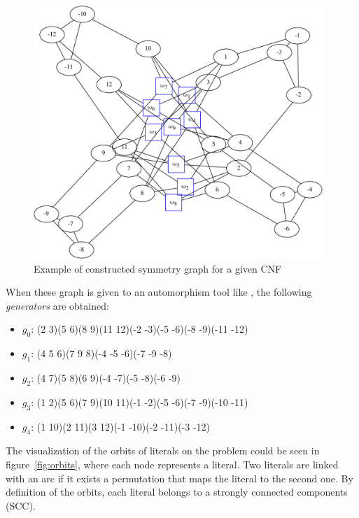 \begin{figure}[h]
	\begin{minipage}[c]{.2\textwidth}
		
	\end{minipage}
	\begin{minipage}[l]{.75\textwidth}
		\includegraphics[width=4.3in]{cnfs/graph_cnf_opt-crop}
	\end{minipage}
	\caption{Example of constructed symmetry graph for a given CNF}
\end{figure}



When these graph is given to an automorphism tool like \bliss, the following \emph{generators} are 
obtained:
\begin{itemize}[topsep=0em]
\item $g_0$: (2 3)(5 6)(8 9)(11 12)(-2 -3)(-5 -6)(-8 -9)(-11 -12)
\item $g_1$: (4 5 6)(7 9 8)(-4 -5 -6)(-7 -9 -8)
\item $g_2$: (4 7)(5 8)(6 9)(-4 -7)(-5 -8)(-6 -9)
\item $g_3$: (1 2)(5 6)(7 9)(10 11)(-1 -2)(-5 -6)(-7 -9)(-10 -11)
\item $g_4$: (1 10)(2 11)(3 12)(-1 -10)(-2 -11)(-3 -12)
\end{itemize}


The visualization of the orbits of literals on the problem could be seen in figure~\ref{fig:orbits}, where each node represents a literal. Two literals are 
linked with an arc if it exists a permutation that maps the literal to the second one.
By definition of the orbits, each literal belongs to a strongly connected components (SCC).

